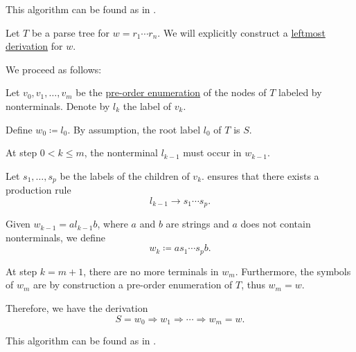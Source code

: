 \begin{comments}
  \item This algorithm can be found as  in \cite{notebook:code}.
\end{comments}

\begin{algorithm}\label{alg:parse_tree_to_leftmost_derivation}
  Let \( T \) be a parse tree for \( w = r_1 \cdots r_n \). We will explicitly construct a \hyperref[def:leftmost_derivation]{leftmost derivation} for \( w \).

  We proceed as follows:
  \begin{thmenum}
     Let \( v_0, v_1, \ldots, v_m \) be the \hyperref[def:ordered_tree_enumeration]{pre-order enumeration} of the nodes of \( T \) labeled by nonterminals. Denote by \( l_k \) the label of \( v_k \).

    Define \( w_0 \coloneqq l_0 \). By assumption, the root label \( l_0 \) of \( T \) is \( S \).

     At step \( 0 < k \leq m \), the nonterminal \( l_{k-1} \) must occur in \( w_{k-1} \).

    Let \( s_1, \ldots, s_p \) be the labels of the children of \( v_k \).  ensures that there exists a production rule
    \begin{equation*}
      l_{k-1} \to s_1 \cdots s_p.
    \end{equation*}

    Given \( w_{k-1} = a l_{k-1} b \), where \( a \) and \( b \) are strings and \( a \) does not contain nonterminals, we define
    \begin{equation*}
      w_k \coloneqq a s_1 \cdots s_p b.
    \end{equation*}

     At step \( k = m + 1 \), there are no more terminals in \( w_m \). Furthermore, the symbols of \( w_m \) are by construction a pre-order enumeration of \( T \), thus \( w_m = w \).

    Therefore, we have the derivation
    \begin{equation*}
      S = w_0 \Rightarrow w_1 \Rightarrow \cdots \Rightarrow w_m = w.
    \end{equation*}
  \end{thmenum}
\end{algorithm}
\begin{comments}
  \item This algorithm can be found as  in \cite{notebook:code}.
\end{comments}

